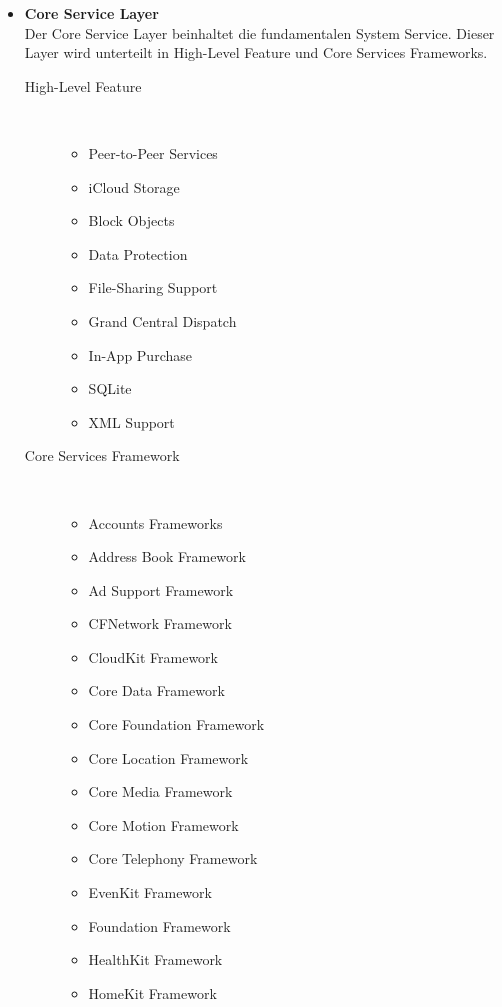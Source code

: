 \begin{description}
\begin{itemize}
         	\item \textbf{Core Service Layer} \\
		Der \glqq Core Service Layer\grqq{} beinhaltet die fundamentalen System Service. Dieser Layer wird unterteilt in High-Level Feature und Core Services Frameworks.
		\begin{description}
			\item[\glqq High-Level Feature\grqq{}]~\par
			\begin{itemize}
				\item Peer-to-Peer Services
				\item iCloud Storage
				\item Block Objects
				\item Data Protection
				\item File-Sharing Support
				\item Grand Central Dispatch
				\item In-App Purchase
				\item SQLite
				\item XML Support 
			\end{itemize}
			\item[\glqq Core Services Framework\grqq{}]~\par
			\begin{multicols}{2}
			\begin{itemize}
				\item Accounts Frameworks
				\item Address Book Framework
				\item Ad Support Framework
				\item CFNetwork Framework
				\item CloudKit Framework
				\item Core Data Framework
				\item Core Foundation Framework
				\item Core Location Framework
				\item Core Media Framework
				\item Core Motion Framework
				\item Core Telephony Framework
				\item EvenKit Framework
				\item Foundation Framework
				\item HealthKit Framework
				\item HomeKit Framework

\end{itemize}
\end{multicols}
\end{description}
\end{itemize}
\end{description}
